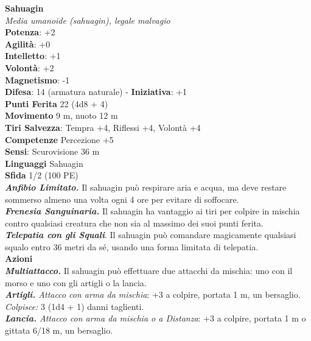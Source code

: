 \begin{multicols}{2}
\medskip\textbf{Sahuagin}\\
\emph{Media umanoide (sahuagin), legale malvagio}\\
\textbf{Potenza}: +2\\
\textbf{Agilità}: +0\\
\textbf{Intelletto}: +1\\
\textbf{Volontà}: +2\\
\textbf{Magnetismo}: -1\\
\textbf{Difesa}: 14 (armatura naturale) - \textbf{Iniziativa}: +1\\
\textbf{Punti Ferita} 22 (4d8 + 4)\\
\textbf{Movimento} 9 m, nuoto 12 m\\
\textbf{Tiri Salvezza}: Tempra +4, Riflessi +4, Volontà +4\\
\textbf{Competenze} Percezione +5\\
\textbf{Sensi}: Scurovisione 36 m\\
\textbf{Linguaggi} Sahuagin\\
\textbf{Sfida} 1/2 (100 PE)\smallskip\\
\emph{\textbf{Anfibio Limitato.}} Il sahuagin può respirare aria e acqua, ma deve restare sommerso almeno una volta ogni 4 ore per evitare di soffocare.\\

\emph{\textbf{Frenesia Sanguinaria.}} Il sahuagin ha vantaggio ai tiri per colpire in mischia contro qualsiasi creatura che non sia al massimo dei suoi punti ferita.\\

\emph{\textbf{Telepatia con gli Squali}}. Il sahuagin può comandare magicamente qualsiasi squalo entro 36 metri da sé, usando una forma limitata di telepatia.\\

\smallskip\textbf{Azioni}\\

\emph{\textbf{Multiattacco.}} Il sahuagin può effettuare due attacchi da mischia: uno con il morso e uno con gli artigli o la lancia.\\
\emph{\textbf{Artigli.} Attacco con arma da mischia}: +3 a colpire, portata 1 m, un bersaglio.\\
\emph{Colpisce:} 3 (1d4 + 1) danni taglienti.\\
\emph{\textbf{Lancia.} Attacco con arma da mischia o a Distanza}: +3 a colpire, portata 1 m o gittata 6/18 m, un bersaglio.\\


\end{multicols}
